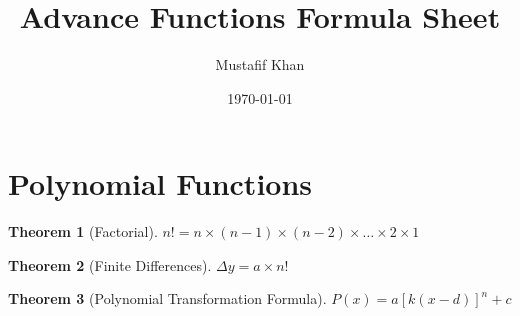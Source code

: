 \documentclass[12pt, letterpaper]{article}
\title{Advance Functions Formula Sheet}
\author{Mustafif Khan}
\date{\today}
\theoremstyle{break}
\newtheorem{theorem}{Theorem}
\begin{document}
\maketitle
{}
\newpage
\tableofcontents
\newpage

\section{Polynomial Functions}
\begin{theorem} [Factorial]
    $n! = n \times (n-1) \times (n-2) \times \dots \times 2 \times 1$
\end{theorem}
%
\begin{theorem}[Finite Differences]
    $\Delta y = a \times n!$
\end{theorem}
%
\begin{theorem}[Polynomial Transformation Formula]
    $P(x)=a[k(x-d)]^n + c$
\end{theorem}
\end{document}
